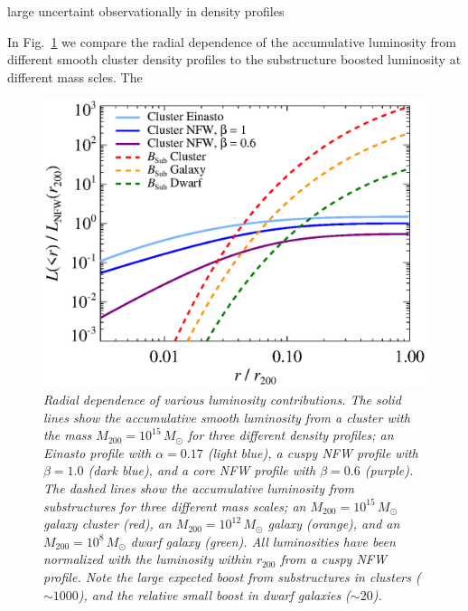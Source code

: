 \documentclass[10pt,aps,pra,reprint,amsmath,amsfonts,amssymb,showpacs]{revtex4-1}
\newcommand{\msun}{{M_\odot}}
\newcommand{\rvir}{r_{200}}
\newcommand{\mvir}{M_{200}}
\begin{document}
large uncertaint observationally in density profiles

In Fig.~\ref{fig:radial_lum} we compare the radial dependence of the
accumulative luminosity from different smooth cluster density profiles
to the substructure boosted luminosity at different mass scles. The

\begin{figure}%
 \includegraphics[width=0.99\columnwidth]{figures/dens.prof.eps}
\caption{\it Radial dependence of various luminosity
  contributions. The solid lines show the accumulative smooth
  luminosity from a cluster with the mass $\mvir=10^{15}\,\msun$ for
  three different density profiles; an Einasto profile with
  $\alpha=0.17$ (light blue), a cuspy NFW profile with $\beta=1.0$
  (dark blue), and a core NFW profile with $\beta=0.6$ (purple). The
  dashed lines show the accumulative luminosity from substructures for
  three different mass scales; an $\mvir=10^{15}\,\msun$ galaxy
  cluster (red), an $\mvir=10^{12}\,\msun$ galaxy (orange), and an
  $\mvir=10^{8}\,\msun$ dwarf galaxy (green). All luminosities have
  been normalized with the luminosity within $\rvir$ from a cuspy NFW
  profile. Note the large expected boost from substructures in
  clusters ($\sim1000$), and the relative small boost in dwarf
  galaxies ($\sim20$).}
 \label{fig:radial_lum}
\end{figure}
\end{document}
